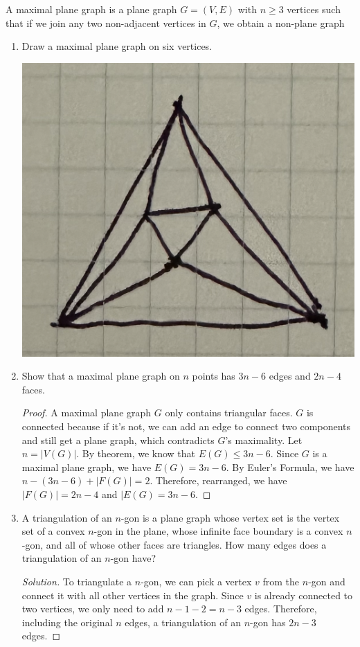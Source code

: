 \documentclass{article}
\newenvironment{problem}[2][Problem]{\begin{trivlist}
\item[\hskip \labelsep {\bfseries #1}\hskip \labelsep {\bfseries #2.}]}{\end{trivlist}}
\begin{document}
\begin{problem}{4.7.7}
    A maximal plane graph is a plane graph $G = (V, E)$ with $n \geq 3$ vertices such that if we join any two non-adjacent vertices in $G$, we obtain a non-plane graph
\end{problem}

\begin{enumerate}[label=(\alph*)]
    \item Draw a maximal plane graph on six vertices.

    \includegraphics[width=.25\textwidth]{Q477a}

    \item Show that a maximal plane graph on $n$ points has $3n - 6$ edges and $2n - 4$ faces.

    \begin{proof}
        A maximal plane graph $G$ only contains triangular faces. $G$ is connected because if it's not, we can add an edge to connect two components and still get a plane graph, which contradicts $G$'s maximality. Let $n = |V(G)|$. By theorem, we know that $E(G) \leq 3n - 6$. Since $G$ is a maximal plane graph, we have $E(G) = 3n - 6$. By Euler's Formula, we have $n - (3n - 6) + |F(G)| = 2$. Therefore, rearranged, we have $|F(G)| = 2n - 4$ and $|E(G) = 3n - 6$.
    \end{proof}
    
    \item A triangulation of an $n$-gon is a plane graph whose vertex set is the vertex set of a convex $n$-gon in the plane, whose infinite face boundary is a convex $n$-gon, and all of whose other faces are triangles. How many edges does a triangulation of an $n$-gon have?
    
    \begin{proof}[Solution]
        To triangulate a $n$-gon, we can pick a vertex $v$ from the $n$-gon and connect it with all other vertices in the graph. Since $v$ is already connected to two vertices, we only need to add $n - 1 - 2 = n - 3$ edges. Therefore, including the original $n$ edges, a triangulation of an $n$-gon has $2n - 3$ edges.
    \end{proof}
\end{enumerate}
\end{document}
